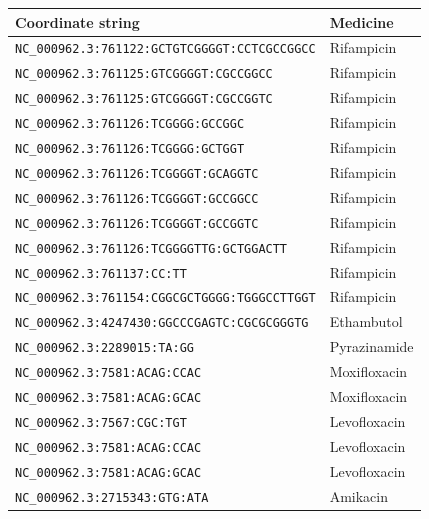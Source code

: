 \begin{tabular}{ll}
\toprule
Coordinate string & Medicine \\
\midrule
\texttt{NC\_000962.3:761122:GCTGTCGGGGT:CCTCGCCGGCC} & Rifampicin \\
\texttt{NC\_000962.3:761125:GTCGGGGT:CGCCGGCC} & Rifampicin \\
\texttt{NC\_000962.3:761125:GTCGGGGT:CGCCGGTC} & Rifampicin \\
\texttt{NC\_000962.3:761126:TCGGGG:GCCGGC} & Rifampicin \\
\texttt{NC\_000962.3:761126:TCGGGG:GCTGGT} & Rifampicin \\
\texttt{NC\_000962.3:761126:TCGGGGT:GCAGGTC} & Rifampicin \\
\texttt{NC\_000962.3:761126:TCGGGGT:GCCGGCC} & Rifampicin \\
\texttt{NC\_000962.3:761126:TCGGGGT:GCCGGTC} & Rifampicin \\
\texttt{NC\_000962.3:761126:TCGGGGTTG:GCTGGACTT} & Rifampicin \\
\texttt{NC\_000962.3:761137:CC:TT} & Rifampicin \\
\texttt{NC\_000962.3:761154:CGGCGCTGGGG:TGGGCCTTGGT} & Rifampicin \\
\texttt{NC\_000962.3:4247430:GGCCCGAGTC:CGCGCGGGTG} & Ethambutol \\
\texttt{NC\_000962.3:2289015:TA:GG} & Pyrazinamide \\
\texttt{NC\_000962.3:7581:ACAG:CCAC} & Moxifloxacin \\
\texttt{NC\_000962.3:7581:ACAG:GCAC} & Moxifloxacin \\
\texttt{NC\_000962.3:7567:CGC:TGT} & Levofloxacin \\
\texttt{NC\_000962.3:7581:ACAG:CCAC} & Levofloxacin \\
\texttt{NC\_000962.3:7581:ACAG:GCAC} & Levofloxacin \\
\texttt{NC\_000962.3:2715343:GTG:ATA} & Amikacin \\
\bottomrule
\end{tabular}
